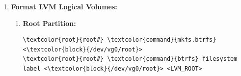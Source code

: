\documentclass[10pt, a4paper, onecolumn, oneside, titlepage, openany]{book}
\begin{document}
\begin{enumerate}
\begin{itemize}
\begin{Verbatim}[commandchars=\\\{\}]
\textcolor{root}{root#} \textcolor{command}{lvm} lvdisplay
\end{Verbatim}
    \end{itemize}
    \item \textbf{Format LVM Logical Volumes:}
    \begin{enumerate}
        \item \textbf{Root Partition:}
\begin{Verbatim}[commandchars=\\\{\}]
\textcolor{root}{root#} \textcolor{command}{mkfs.btrfs} <\textcolor{block}{/dev/vg0/root}>
\textcolor{root}{root#} \textcolor{command}{btrfs} filesystem label <\textcolor{block}{/dev/vg0/root}> <LVM_ROOT>
\end{Verbatim}
    \end{enumerate}
\end{enumerate}
\end{document}
